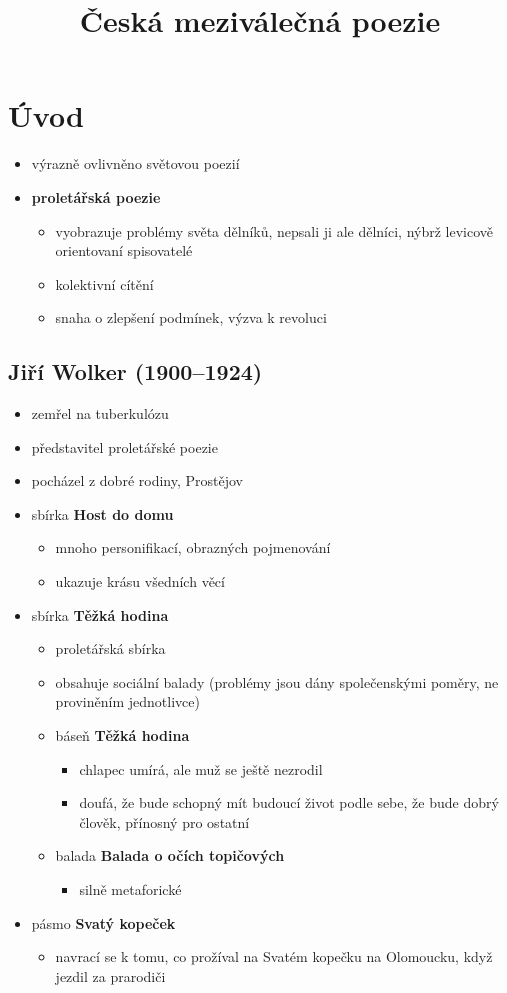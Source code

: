 \title{Česká meziválečná poezie}

\section{Úvod}
\begin{itemize}
\item výrazně ovlivněno světovou poezií
\item \textbf{proletářská poezie} 
	\begin{itemize}
	\item vyobrazuje problémy světa dělníků, nepsali ji ale dělníci, nýbrž levicově orientovaní spisovatelé
	\item kolektivní cítění
	\item snaha o zlepšení podmínek, výzva k revoluci
	\end{itemize}
\end{itemize}


\subsection{Jiří Wolker (1900--1924)}
\begin{itemize}
\item zemřel na tuberkulózu
\item představitel proletářské poezie
\item pocházel z dobré rodiny, Prostějov
\item sbírka \textbf{Host do domu}
	\begin{itemize}
	\item mnoho personifikací, obrazných pojmenování
	\item ukazuje krásu všedních věcí
	\end{itemize}
\item sbírka \textbf{Těžká hodina}
	\begin{itemize}
	\item proletářská sbírka
	\item obsahuje sociální balady (problémy jsou dány společenskými poměry, ne proviněním jednotlivce)
	\item báseň \textbf{Těžká hodina} 
		\begin{itemize}
		\item chlapec umírá, ale muž se ještě nezrodil
		\item doufá, že bude schopný mít budoucí život podle sebe, že bude dobrý člověk, přínosný pro ostatní
		\end{itemize}
	\item balada \textbf{Balada o očích topičových}
		\begin{itemize}
		\item silně metaforické
		\end{itemize}
	\end{itemize}
\item pásmo \textbf{Svatý kopeček}
	\begin{itemize}
	\item navrací se k tomu, co prožíval na Svatém kopečku na Olomoucku, když jezdil za prarodiči	
	\end{itemize}
\end{itemize}

